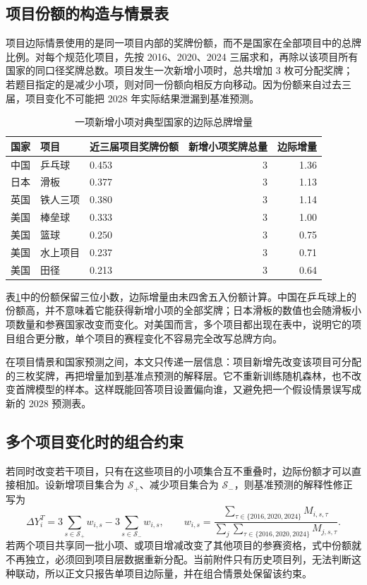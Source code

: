 \documentclass[UTF8,11pt,a4paper]{ctexart}
\begin{document}
\subsection{项目份额的构造与情景表}

项目边际情景使用的是同一项目内部的奖牌份额，而不是国家在全部项目中的总牌比例。对每个规范化项目，先按 2016、2020、2024 三届求和，再除以该项目所有国家的同口径奖牌总数。项目发生一次新增小项时，总共增加 3 枚可分配奖牌；若题目指定的是减少小项，则对同一份额向相反方向移动。因为份额来自过去三届，项目变化不可能把 2028 年实际结果泄漏到基准预测。

\begin{table}[H]
\centering
\caption{一项新增小项对典型国家的边际总牌增量}
\label{tab:marginal-examples}
\small
\begin{tabular}{lllrr}
\toprule
国家 & 项目 & 近三届项目奖牌份额 & 新增小项奖牌总量 & 边际增量\\
\midrule
中国 & 乒乓球 & 0.453 & 3 & 1.36\\
日本 & 滑板 & 0.377 & 3 & 1.13\\
英国 & 铁人三项 & 0.380 & 3 & 1.14\\
美国 & 棒垒球 & 0.333 & 3 & 1.00\\
美国 & 篮球 & 0.250 & 3 & 0.75\\
美国 & 水上项目 & 0.237 & 3 & 0.71\\
美国 & 田径 & 0.213 & 3 & 0.64\\
\bottomrule
\end{tabular}
\end{table}

表\ref{tab:marginal-examples}中的份额保留三位小数，边际增量由未四舍五入份额计算。中国在乒乓球上的份额高，并不意味着它能获得新增小项的全部奖牌；日本滑板的数值也会随滑板小项数量和参赛国家改变而变化。对美国而言，多个项目都出现在表中，说明它的项目组合更分散，单个项目的赛程变化不容易完全改写总牌方向。

在项目情景和国家预测之间，本文只传递一层信息：项目新增先改变该项目可分配的三枚奖牌，再把增量加到基准点预测的解释层。它不重新训练随机森林，也不改变首牌模型的样本。这样既能回答项目设置偏向谁，又避免把一个假设情景误写成新的 2028 预测表。

\subsection{多个项目变化时的组合约束}

若同时改变若干项目，只有在这些项目的小项集合互不重叠时，边际份额才可以直接相加。设新增项目集合为 $\mathcal{S}_+$、减少项目集合为 $\mathcal{S}_-$，则基准预测的解释性修正写为
\begin{equation}
\Delta Y^T_i=3\sum_{s\in\mathcal{S}_+}w_{i,s}
-3\sum_{s\in\mathcal{S}_-}w_{i,s},\qquad
w_{i,s}=\frac{\sum_{\tau\in\{2016,2020,2024\}}M_{i,s,\tau}}
{\sum_j\sum_{\tau\in\{2016,2020,2024\}}M_{j,s,\tau}}.
\end{equation}
若两个项目共享同一批小项、或项目增减改变了其他项目的参赛资格，式中份额就不再独立，必须回到项目层数据重新分配。当前附件只有历史项目列，无法判断这种联动，所以正文只报告单项目边际量，并在组合情景处保留该约束。
\end{document}
